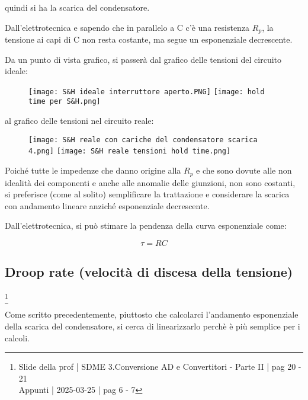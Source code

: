 \newpage

quindi si ha la scarica del condensatore. \newline 

Dall'elettrotecnica e sapendo che in parallelo a C c'è una resistenza $R_p$, la tensione ai capi di C non resta costante, 
ma segue un esponenziale decrescente. \newline 

Da un punto di vista grafico, si passerà dal grafico delle tensioni del circuito ideale: 

\begin{figure}[h]
    \centering
    \texttt{[image: S\&H ideale interruttore aperto.PNG]}
    \texttt{[image: hold time per S\&H.png]}
\end{figure}

al grafico delle tensioni nel circuito reale: 

\begin{figure}[h]
    \centering
    \texttt{[image: S\&H reale con cariche del condensatore scarica 4.png]}
    \texttt{[image: S\&H reale tensioni hold time.png]}
\end{figure}

Poiché tutte le impedenze che danno origine alla $R_p$ e che sono dovute alle non idealità dei componenti 
e anche alle anomalie delle giunzioni, non sono costanti, si preferisce (come al solito) semplificare la trattazione 
e considerare la scarica con andamento lineare anziché esponenziale decrescente. \newline 

Dall'elettrotecnica, si può stimare la pendenza della curva esponenziale come: 

{
    \Large 
    \begin{equation}
        \tau = RC
    \end{equation}
}

\newpage 

\subsection{Droop rate (velocità di discesa della tensione)} 
\footnote{Slide della prof | SDME 3.Conversione AD e Convertitori - Parte II | pag 20 - 21 \\  
Appunti | 2025-03-25 | pag 6 - 7} 

Come scritto precedentemente, piuttosto che calcolarci l'andamento esponenziale della scarica del condensatore, 
si cerca di linearizzarlo perchè è più semplice per i calcoli. \newline 


